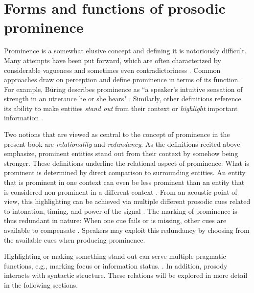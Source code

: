 \chapter{Forms and functions of prosodic prominence} \label{ch:background prominence}

Prominence is a somewhat elusive concept and defining it is notoriously difficult. Many attempts have been put forward, which are often characterized by considerable vagueness and sometimes even contradictoriness \citep{cangemiIntegratingPhoneticsPhonology2020}. Common approaches draw on perception and define prominence in terms of its function. For example, Büring describes prominence as ``a speaker's intuitive sensation of strength in an utterance he or she hears" \citeyearpar[1]{buringIntonationMeaning2016}. Similarly, other definitions reference its ability to make entities \textit{stand out} from their context \citep{terkenFundamentalFrequencyPerceived1991, terkenPerceptionProsodicProminence2000} or \textit{highlight} important information \citep{cangemiIntegratingPhoneticsPhonology2020}. 
	
Two notions that are viewed as central to the concept of prominence in the present book are \textit{relationality} and \textit{redundancy}. As the definitions recited above emphasize, prominent entities stand out from their context by somehow being stronger. These definitions underline the relational aspect of prominence: What is prominent is determined by direct comparison to surrounding entities. An entity that is prominent in one context can even be less prominent than an entity that is considered non-prominent in a different context \citep{cangemiIntegratingPhoneticsPhonology2020}. From an acoustic point of view, this highlighting can be achieved via multiple different prosodic cues related to intonation, timing, and power of the signal \citep[e.g.,][]{fryDurationIntensityPhysical1955, sluijterSpectralBalanceAcoustic1996, kochanskiLoudnessPredictsProminence2005, baumannWhatMakesWord2018, roessigTracingPhoneticSpace2022}. The marking of prominence is thus redundant in nature: When one cue fails or is missing, other cues are available to compensate \citep{winterSpokenLanguageAchieves2014}. Speakers may exploit this redundancy by choosing from the available cues when producing prominence. 

Highlighting or making something stand out can serve multiple pragmatic functions, e.g., marking focus or information status. \citep[e.g.,][]{buringSemanticsIntonationInformation2007, feryPitchAccentScaling2008, baumannCoreferenceLexicalGivenness2013, coleProsodyContextReview2015}. In addition, prosody interacts with syntactic structure. These relations will be explored in more detail in the following sections.

